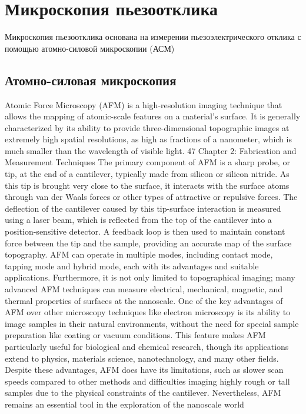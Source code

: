 \section{Микроскопия пьезоотклика}
Микроскопия пьезоотклика основана на измерении пьезоэлектрического отклика с помощью атомно-силовой микроскопии (АСМ)
\subsection{Атомно-силовая микроскопия}
Atomic Force Microscopy (AFM) is a high-resolution imaging technique that allows the mapping of
atomic-scale features on a material’s surface. It is generally characterized by its ability to provide
three-dimensional topographic images at extremely high spatial resolutions, as high as fractions of
a nanometer, which is much smaller than the wavelength of visible light.
47
Chapter 2: Fabrication and Measurement Techniques
The primary component of AFM is a sharp probe, or tip, at the end of a cantilever, typically made
from silicon or silicon nitride. As this tip is brought very close to the surface, it interacts with the
surface atoms through van der Waals forces or other types of attractive or repulsive forces.
The deflection of the cantilever caused by this tip-surface interaction is measured using a laser
beam, which is reflected from the top of the cantilever into a position-sensitive detector. A feedback
loop is then used to maintain constant force between the tip and the sample, providing an accurate
map of the surface topography.
AFM can operate in multiple modes, including contact mode, tapping mode and hybrid mode, each
with its advantages and suitable applications. Furthermore, it is not only limited to topographical
imaging; many advanced AFM techniques can measure electrical, mechanical, magnetic, and
thermal properties of surfaces at the nanoscale.
One of the key advantages of AFM over other microscopy techniques like electron microscopy is
its ability to image samples in their natural environments, without the need for special sample
preparation like coating or vacuum conditions. This feature makes AFM particularly useful for
biological and chemical research, though its applications extend to physics, materials science,
nanotechnology, and many other fields.
Despite these advantages, AFM does have its limitations, such as slower scan speeds compared to
other methods and difficulties imaging highly rough or tall samples due to the physical constraints
of the cantilever. Nevertheless, AFM remains an essential tool in the exploration of the nanoscale
world

